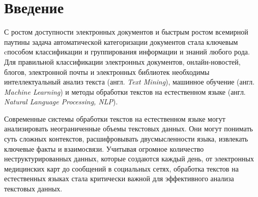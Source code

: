 \chapter*{Введение}

С ростом доступности электронных документов и быстрым ростом всемирной паутины задача автоматической категоризации документов стала ключевым cпособом классификации и группирования информации и знаний любого рода. Для правильной классификации электронных документов, онлайн-новостей, блогов, электронной почты и электронных библиотек необходимы интеллектуальный анализ текста (англ. \textit{Text Mining}), машинное обучение (англ. \textit{Machine Learning}) и методы обработки текстов на естественном языке (англ. \textit{Natural Language Processing, NLP}).

Современные системы обработки текстов на естественном языке
могут анализировать неограниченные объемы текстовых данных. Они могут понимать суть сложных контекстов, расшифровывать двусмысленности языка, извлекать ключевые факты и взаимосвязи. Учитывая огромное количество неструктурированных данных, которые создаются каждый день, от электронных медицинских карт до сообщений в социальных сетях, обработка текстов на естественных языках стала критически важной для эффективного анализа текстовых данных.


\clearpage
